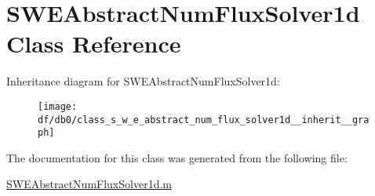 \hypertarget{class_s_w_e_abstract_num_flux_solver1d}{}\section{S\+W\+E\+Abstract\+Num\+Flux\+Solver1d Class Reference}
\label{class_s_w_e_abstract_num_flux_solver1d}


Inheritance diagram for S\+W\+E\+Abstract\+Num\+Flux\+Solver1d\+:
\nopagebreak
\begin{figure}[H]
\begin{center}
\leavevmode
\texttt{[image: df/db0/class\_s\_w\_e\_abstract\_num\_flux\_solver1d\_\_inherit\_\_graph]}
\end{center}
\end{figure}


The documentation for this class was generated from the following file\+:\begin{DoxyCompactItemize}
\item 
\hyperlink{_s_w_e_abstract_num_flux_solver1d_8m}{S\+W\+E\+Abstract\+Num\+Flux\+Solver1d.\+m}\end{DoxyCompactItemize}
